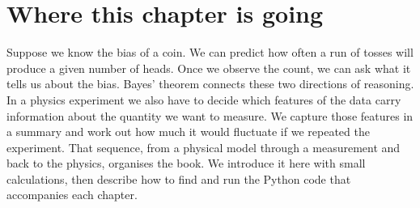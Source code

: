 \providecommand{\SamePkMaxDev}{}\renewcommand{\SamePkMaxDev}{1.500\times10^{-12}}
\providecommand{\SameSkewA}{}\renewcommand{\SameSkewA}{2.455}
\providecommand{\SameSkewB}{}\renewcommand{\SameSkewB}{0.02076}
\providecommand{\SameBzeroA}{}\renewcommand{\SameBzeroA}{51}
\providecommand{\SameBzeroB}{}\renewcommand{\SameBzeroB}{3}
\providecommand{\SameBzeroAzero}{}\renewcommand{\SameBzeroAzero}{34}
\providecommand{\SameBzeroBzero}{}\renewcommand{\SameBzeroBzero}{19}
\providecommand{\SameMinA}{}\renewcommand{\SameMinA}{-0.5344}
\providecommand{\SameNblob}{}\renewcommand{\SameNblob}{60}
\providecommand{\ColMuHat}{}\renewcommand{\ColMuHat}{0.959}
\providecommand{\ColMuLo}{}\renewcommand{\ColMuLo}{0.805}
\providecommand{\ColMuHi}{}\renewcommand{\ColMuHi}{1.116}
\providecommand{\ColNtot}{}\renewcommand{\ColNtot}{4769}
\providecommand{\CmbMeanRatio}{}\renewcommand{\CmbMeanRatio}{1.002}
\providecommand{\CmbScatterLow}{}\renewcommand{\CmbScatterLow}{0.2324}
\providecommand{\CmbScatterHigh}{}\renewcommand{\CmbScatterHigh}{0.02923}
\providecommand{\GwMeanRatio}{}\renewcommand{\GwMeanRatio}{1.006}
\providecommand{\GwNbins}{}\renewcommand{\GwNbins}{8192}
\providecommand{\SeedIdentical}{}\renewcommand{\SeedIdentical}{yes}
\providecommand{\SeedFirstDraw}{}\renewcommand{\SeedFirstDraw}{0.217}
\providecommand{\SeedOtherFirstDraw}{}\renewcommand{\SeedOtherFirstDraw}{0.4034}
\providecommand{\PiHat}{}\renewcommand{\PiHat}{3.143}
\providecommand{\PiErr}{}\renewcommand{\PiErr}{0.001641}
\providecommand{\PiN}{}\renewcommand{\PiN}{1000000}
\section*{Where this chapter is going}

Suppose we know the bias of a coin. We can predict how often a run of tosses
will produce a given number of heads. Once we observe the count, we can ask
what it tells us about the bias. Bayes' theorem connects these two directions
of reasoning. In a physics experiment we also have to decide which features
of the data carry information about the quantity we want to measure. We
capture those features in a summary and work out how much it would fluctuate
if we repeated the experiment. That sequence, from a physical model through
a measurement and back to the physics, organises the book. We introduce it
here with small calculations, then describe how to find and run the Python
code that accompanies each chapter.

